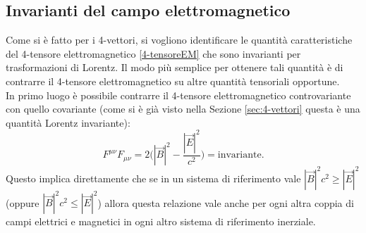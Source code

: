 \subsection{Invarianti del campo elettromagnetico}
Come si è fatto per i 4-vettori, si vogliono identificare le quantità caratteristiche del 4-tensore elettromagnetico \eqref{4-tensoreEM} che sono invarianti per trasformazioni di Lorentz. Il modo più semplice per ottenere tali quantità è di contrarre il 4-tensore elettromagnetico su altre quantità tensoriali opportune.\\

In primo luogo è possibile contrarre il 4-tensore elettromagnetico controvariante con quello covariante (come si è già visto nella Sezione \ref{sec:4-vettori} questa è una quantità Lorentz invariante):
\begin{equation}
    F^{\mu\nu}F_{\mu\nu}=2\biggl(|\vec B|^2-\frac{|\vec E|^2}{c^2}\biggr)=\text{invariante}.
\end{equation}
Questo implica direttamente che se in un sistema di riferimento vale $|\vec B|^2c^2\geq|\vec E|^2$ (oppure $|\vec B|^2c^2\leq|\vec E|^2$) allora questa relazione vale anche per ogni altra coppia di campi elettrici e magnetici in ogni altro sistema di riferimento inerziale.\\

